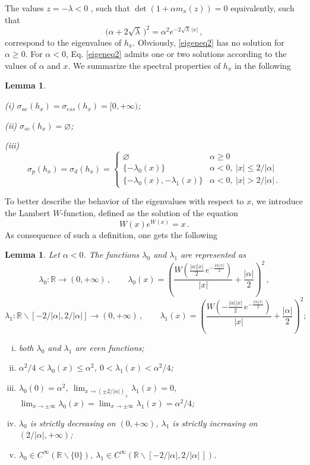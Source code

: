\documentclass[a4paper,11pt,reqno]{amsart}
\newtheorem{lemma}[theorem]{Lemma}
\theoremstyle{definition}
\numberwithin{equation}{section}
\newcommand{\RE}{\mathbb R}
\newcommand{\mm}{{ m}}
\begin{document}
The values  $z=-\lambda < 0$ , such that  $\det(1+\alpha\mm_{x}(z)) =0$ equivalently, such that 
\begin{equation}\label{eigeneq2}
     \big(\alpha+2\sqrt{\lambda}\,\big)^{2} =\alpha^{2}  e^{-2\sqrt{\lambda}\,|x|}\,,
\end{equation}
correspond to the eigenvalues of $h_x$.
Obviously, \eqref{eigeneq2} has no solution for $\alpha\geq0$. For $\alpha <0$, Eq. 
\eqref{eigeneq2}  admits one or two solutions according to the values of $\alpha$ and $x$. We summarize the spectral properties of $h_{x}$ in the following
\begin{lemma}\label{l:spectrumhx}
    \item (i) $\sigma_{ac}(h_x) =\sigma_{ess}(h_x) = [0,+\infty)$; 
    \item (ii) $\sigma_{sc}(h_x) = \varnothing$;
    \item (iii)
     \[\sigma_{p}(h_x)=\sigma_{d}(h_{x}) =\begin{cases}\varnothing&\alpha \geq 0\\
    \{ -\lambda_0(x)\}& \alpha<0,\ |x|\leq 2/|\alpha|\\
    \{ -\lambda_0(x), -\lambda_1(x)\}&\alpha<0,\ |x|> 2/|\alpha|\,.\end{cases}\]
\end{lemma}
To better describe the behavior of the eigenvalues with respect to $x$, we introduce the  Lambert $W$-function,  defined as the solution of the equation 
\[W(x)e^{W(x)} = x\,.
\]
As consequence of such a definition, one gets the following
\begin{lemma}\label{l:lambda0} Let $\alpha<0$. The functions $\lambda_{0}$ and $\lambda_{1}$ are represented as 
\[
 \lambda_0:\RE\to (0,+\infty)\,,\qquad  \lambda_0(x)  = \left(\frac{ W\left(\frac{|\alpha||x|}{2} \,e^{-\frac{|\alpha||x|}{2}} \right)}{|x|} + 
   \frac{|\alpha|}{2}\right)^{\!\!2}\,,\]
   \[
 \lambda_1:\RE\backslash[-2/|\alpha|,2/|\alpha|]\to (0,+\infty)\,,\qquad   \lambda_1(x)  = \left(\frac{ W\left(-\frac{|\alpha||x|}{2}\, e^{-\frac{|\alpha| |x|}{2}} \right)}{|x|} + \frac{|\alpha|}{2}\right)^{\!\!2};
\]
\begin{enumerate}[(i)]
\item both $\lambda_{0}$ and $\lambda_{1}$ are even functions; 
\item $\alpha^2/4<\lambda_0(x)\leq\alpha^2$, $0<\lambda_1(x)<\alpha^2/4$;
\item $\lambda_0(0)=\alpha^2$, $ \lim_{x\to (\pm2/|\alpha|)_\pm}\lambda_1(x)= 0$, $\lim_{x\to\pm\infty} \lambda_0(x) =\lim_{x\to\pm\infty } \lambda_1(x) =\alpha^2/4$;
\item $\lambda_0$ is strictly decreasing on $(0,+\infty)$, $\lambda_1$ is strictly increasing on $(2/|\alpha|,+\infty)$;
\item $\lambda_0 \in   C^\infty(\RE\backslash\{0\})$, $\lambda_1 \in   C^\infty(\RE\backslash[-2/|\alpha|,2/|\alpha|\,])$.
\end{enumerate}
\end{lemma}
\end{document}
